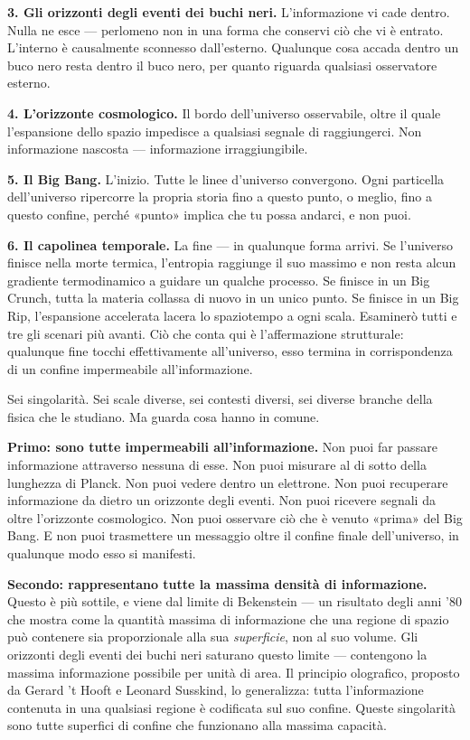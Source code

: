 \documentclass[11pt, twoside, openright]{book}
\begin{document}
\textbf{3. Gli orizzonti degli eventi dei buchi neri.} L'informazione vi cade dentro. Nulla ne esce --- perlomeno non in una forma che conservi ciò che vi è entrato. L'interno è causalmente sconnesso dall'esterno. Qualunque cosa accada dentro un buco nero resta dentro il buco nero, per quanto riguarda qualsiasi osservatore esterno.

\textbf{4. L'orizzonte cosmologico.} Il bordo dell'universo osservabile, oltre il quale l'espansione dello spazio impedisce a qualsiasi segnale di raggiungerci. Non informazione nascosta --- informazione irraggiungibile.

\textbf{5. Il Big Bang.} L'inizio. Tutte le linee d'universo convergono. Ogni particella dell'universo ripercorre la propria storia fino a questo punto, o meglio, fino a questo confine, perché «punto» implica che tu possa andarci, e non puoi.

\textbf{6. Il capolinea temporale.} La fine --- in qualunque forma arrivi. Se l'universo finisce nella morte termica, l'entropia raggiunge il suo massimo e non resta alcun gradiente termodinamico a guidare un qualche processo. Se finisce in un Big Crunch, tutta la materia collassa di nuovo in un unico punto. Se finisce in un Big Rip, l'espansione accelerata lacera lo spaziotempo a ogni scala. Esaminerò tutti e tre gli scenari più avanti. Ciò che conta qui è l'affermazione strutturale: qualunque fine tocchi effettivamente all'universo, esso termina in corrispondenza di un confine impermeabile all'informazione.

Sei singolarità. Sei scale diverse, sei contesti diversi, sei diverse branche della fisica che le studiano. Ma guarda cosa hanno in comune.

\textbf{Primo: sono tutte impermeabili all'informazione.} Non puoi far passare informazione attraverso nessuna di esse. Non puoi misurare al di sotto della lunghezza di Planck. Non puoi vedere dentro un elettrone. Non puoi recuperare informazione da dietro un orizzonte degli eventi. Non puoi ricevere segnali da oltre l'orizzonte cosmologico. Non puoi osservare ciò che è venuto «prima» del Big Bang. E non puoi trasmettere un messaggio oltre il confine finale dell'universo, in qualunque modo esso si manifesti.

\textbf{Secondo: rappresentano tutte la massima densità di informazione.} Questo è più sottile, e viene dal limite di Bekenstein --- un risultato degli anni '80 che mostra come la quantità massima di informazione che una regione di spazio può contenere sia proporzionale alla sua \textit{superficie}, non al suo volume. Gli orizzonti degli eventi dei buchi neri saturano questo limite --- contengono la massima informazione possibile per unità di area. Il principio olografico, proposto da Gerard 't Hooft e Leonard Susskind, lo generalizza: tutta l'informazione contenuta in una qualsiasi regione è codificata sul suo confine. Queste singolarità sono tutte superfici di confine che funzionano alla massima capacità.
\end{document}
